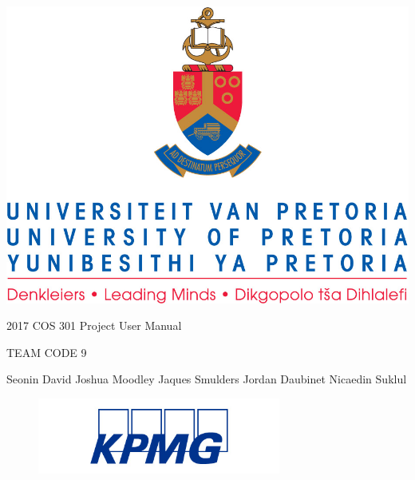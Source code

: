 \documentclass[a4paper,12pt]{article}
\begin{document}
	\begin{center}\thispagestyle{empty}
		\includegraphics{Graphics/uplogo.jpg}
		
		{\Huge 
			2017 COS 301 Project \linebreak
			User Manual \linebreak 
			\par}
		
		{\Huge
			TEAM CODE 9
			\linebreak
			\par}
		
		\begin{LARGE}
			Seonin David
			\linebreak
			\linebreak
			Joshua Moodley
			\linebreak
			\linebreak
			Jaques Smulders
			\linebreak
			\linebreak
			Jordan Daubinet
			\linebreak
			\linebreak
			Nicaedin Suklul
		\end{LARGE}
	\end{center}
	
	\begin{figure}[b]
		\centering
		\includegraphics[width=8cm]{Graphics/kpmgLogo.jpg}
	\end{figure}
\newpage
\tableofcontents
\newpage
\end{document}
